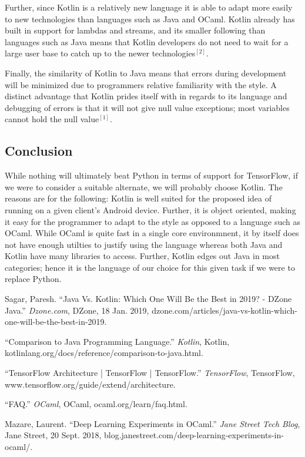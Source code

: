 Further, since Kotlin is a relatively new language it is able to adapt more easily to new technologies than languages such as Java and OCaml. Kotlin already has built in support for lambdas and streams, and its smaller following than languages such as Java means that Kotlin developers do not need to wait for a large user base to catch up to the newer technologies$^{[2]}$.

Finally, the similarity of Kotlin to Java means that errors during development will be minimized due to programmers relative familiarity with the style. A distinct advantage that Kotlin prides itself with in regards to its language and debugging of errors is that it will not give null value exceptions; most variables cannot hold the null value$^{[1]}$.

\subsection{Conclusion}

While nothing will ultimately beat Python in terms of support for TensorFlow, if we were to consider a suitable alternate, we will probably choose Kotlin. The reasons are for the following: Kotlin is well suited for the proposed idea of running on a given client's Android device. Further, it is object oriented, making it easy for the programmer to adapt to the style as opposed to a language such as OCaml. While OCaml is quite fast in a single core environmnent, it by itself does not have enough utilties to justify using the language whereas both Java and Kotlin have many libraries to access. Further, Kotlin edges out Java in most categories; hence it is the language of our choice for this given task if we were to replace Python.

\begin{thebibliography}{9}
\bibitem{} 
Sagar, Paresh. “Java Vs. Kotlin: Which One Will Be the Best in 2019? - DZone Java.” \textit{Dzone.com}, DZone, 18 Jan. 2019, dzone.com/articles/java-vs-kotlin-which-one-will-be-the-best-in-2019.
 
\bibitem{} 
“Comparison to Java Programming Language.” \textit{Kotlin}, Kotlin, kotlinlang.org/docs/reference/comparison-to-java.html.
 
\bibitem{} 
“TensorFlow Architecture  |  TensorFlow  |  TensorFlow.”  \textit{TensorFlow}, TensorFlow, www.tensorflow.org/guide/extend/architecture.

\bibitem{}
“FAQ.” \textit{OCaml}, OCaml, ocaml.org/learn/faq.html.

\bibitem{}
Mazare, Laurent. “Deep Learning Experiments in OCaml.” \textit{Jane Street Tech Blog}, Jane Street, 20 Sept. 2018, blog.janestreet.com/deep-learning-experiments-in-ocaml/. \\
\end{thebibliography}



